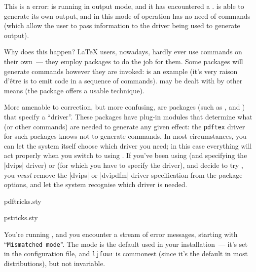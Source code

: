{

This is a \PDFTeX{} error: \PDFTeX{} is running in  output
mode, and it has encountered a %
.  \PDFTeX{} is
able to generate its own output, and in this mode of operation has no
need of  commands (which allow the user to pass
information to the driver being used to generate output).

Why does this happen?  \LaTeX{} users, nowadays, hardly ever use
 commands on their own~--- they employ packages to do the
job for them.  Some packages will generate  commands
however they are invoked:  is an example (it's very
raison d'\^etre is to emit \PS{} code in a sequence of 
commands).   may be dealt with by other means (the
 package offers a usable technique).

More amenable to correction, but more confusing, are packages (such as
,  and ) that
specify a ``driver''.  These packages have plug-in modules that
determine what  (or other commands) are needed to generate
any given effect: the \texttt{pdftex} driver for such packages knows not to
generate  commands.  In most circumstances, you can let
the system itself choose which driver you need; in this case
everything will act properly when you switch to using \PDFLaTeX{}.  If
you've been using  (and specifying the |dvips| driver)
or  (for which you have to specify the driver), and
decide to try \PDFLaTeX{}, you \emph{must} remove the |dvips| or
|dvipdfm| driver specification from the package options, and let the
system recognise which driver is needed.
\begin{ctanrefs}
\item[pdftricks.sty]
\item[pstricks.sty]
\end{ctanrefs}


You're running , and you encounter a stream of error
messages, starting with ``\texttt{Mismatched mode}''.  The mode is the
default used in your installation~--- it's set in the 
configuration file, and \texttt{ljfour} is commonest (since it's the
default in most distributions), but not invariable.

}
